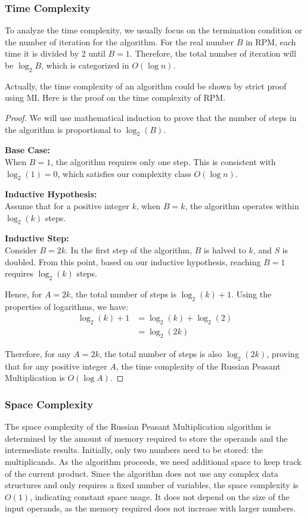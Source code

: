 \documentclass[
	12pt, %
	fleqn, %
	a4paper, %
]{LegrandOrangeBook}
\begin{document}
\subsubsection{Time Complexity}
To analyze the time complexity, we usually focus on the termination condition or the number of iteration for the algorithm. For the real number $B$ in RPM, each time it is divided by 2 until $B = 1$. Therefore, the total number of iteration will be $\log_2 B$, which is categorized in \( O(\log n) \).
\begin{remark}
    Actually, the time complexity of an algorithm could be shown by strict proof using MI. Here is the proof on the time complexity of RPM.
    \begin{proof}
        We will use mathematical induction to prove that the number of steps in the algorithm is proportional to \( \log_2(B) \).

\noindent \textbf{Base Case:}\\
When \( B = 1 \), the algorithm requires only one step. This is consistent with \( \log_2(1) = 0 \), which satisfies our complexity class \( O(\log n) \).

\noindent \textbf{Inductive Hypothesis:}\\
Assume that for a positive integer \( k \), when \( B = k \), the algorithm operates within \( \log_2(k) \) steps.

\noindent \textbf{Inductive Step:}\\
Consider \( B = 2k \). In the first step of the algorithm, \( B \) is halved to \( k \), and \( S \) is doubled. From this point, based on our inductive hypothesis, reaching \( B = 1 \) requires \( \log_2(k) \) steps.

Hence, for \( A = 2k \), the total number of steps is \( \log_2(k) + 1 \). Using the properties of logarithms, we have:
\begin{align*}
\log_2(k) + 1 &= \log_2(k) + \log_2(2) \\
&= \log_2(2k)
\end{align*}

Therefore, for any \( A = 2k \), the total number of steps is also \( \log_2(2k) \), proving that for any positive integer \( A \), the time complexity of the Russian Peasant Multiplication is \( O(\log A) \).
    \end{proof}
\end{remark}
\subsubsection{Space Complexity}
The space complexity of the Russian Peasant Multiplication algorithm is determined by the amount of memory required to store the operands and the intermediate results. Initially, only two numbers need to be stored: the multiplicands. As the algorithm proceeds, we need additional space to keep track of the current product. Since the algorithm does not use any complex data structures and only requires a fixed number of variables, the space complexity is \( O(1) \), indicating constant space usage. It does not depend on the size of the input operands, as the memory required does not increase with larger numbers.
\end{document}
